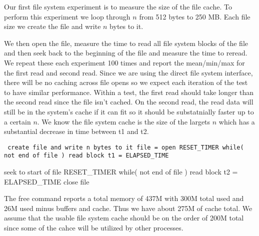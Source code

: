 Our first file system experiment is to measure the size of the file cache.
To perform this experiment we loop through $n$ from 512 bytes to 250 MB.
Each file size we create the file and write $n$ bytes to it.

We then open the file, measure the time to read all file system blocks of the file and then seek back to the beginning of the file and measure the time to reread.
We repeat these each experiment 100 times and report the mean/min/max for the first read and second read.
Since we are using the direct file system interface, there will be no caching across file opens so we expect each iteration of the test to have similar performance.
Within a test, the first read should take longer than the second read since the file isn't cached.
On the second read, the read data will still be in the system's cache if it can fit so it should be substatnially faster up to a certain $n$.
We know the file system cache is the size of the largets $n$ which has a substantial decrease in time between t1 and t2.

{\tt
  create file and write n bytes to it
  file = open
  RESET_TIMER
  while( not end of file )
    read block
  t1 = ELAPSED_TIME
  
  seek to start of file
  RESET_TIMER
  while( not end of file )
    read block
  t2 = ELAPSED_TIME    
  close file
}

The free command reports a total memory of 437M with 300M total used and 26M used minus buffers and cache.
Thus we have about 275M of cache total.
We assume that the usable file system cache should be on the order of 200M total since some of the cahce will be utilized by other processes.

